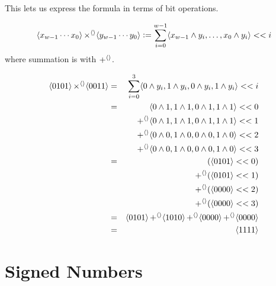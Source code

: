 This lets us express the formula in terms of bit operations.

\begin{definition}
\begin{align*}
  \langle x_{w-1}\cdots{}x_{0} \rangle \operatorname{\times^{\langle\rangle}} \langle y_{w-1}\cdots{}y_{0} \rangle \vcentcolon=
  \sum_{i=0}^{w-1} \langle x_{w-1} \land y_{i},\ldots,x_{0} \land y_{i} \rangle << i
\end{align*}
where summation is with $\operatorname{+^{\langle\rangle}}$.
\end{definition}

\begin{example}[$5 \times 3$]
  \begin{align}
    \langle 0101 \rangle \operatorname{\times^{\langle\rangle}} \langle 0011 \rangle &=& \sum_{i=0}^{3} \langle 0 \land y_{i},1\land y_{i}, 0\land y_{i}, 1 \land y_{i} \rangle << i \\
                                              &=& \langle 0 \land 1,1\land 1, 0\land 1, 1 \land 1 \rangle << 0 \\\nonumber
                                              &&\operatorname{+^{\langle\rangle}} \langle 0 \land 1,1\land 1, 0\land 1, 1 \land 1 \rangle << 1 \\\nonumber
                                              &&\operatorname{+^{\langle\rangle}} \langle 0 \land 0,1\land 0, 0\land 0, 1 \land 0 \rangle << 2 \\\nonumber
                                              &&\operatorname{+^{\langle\rangle}} \langle 0 \land 0,1\land 0, 0\land 0, 1 \land 0 \rangle << 3 \\
                                              &=&         (\langle 0101 \rangle << 0) \\\nonumber
                                              &&\operatorname{+^{\langle\rangle}} (\langle 0101 \rangle << 1) \\\nonumber
                                              && \operatorname{+^{\langle\rangle}} (\langle 0000 \rangle << 2) \\\nonumber
                                              && \operatorname{+^{\langle\rangle}} (\langle 0000 \rangle << 3) \\
                                              &=& \langle 0101 \rangle \operatorname{+^{\langle\rangle}} \langle 1010 \rangle \operatorname{+^{\langle\rangle}} \langle 0000 \rangle  \operatorname{+^{\langle\rangle}} \langle 0000 \rangle \\
    &=& \langle 1111 \rangle
  \end{align}
\end{example}

\section{Signed Numbers}
\label{sec:signed-numbers}

